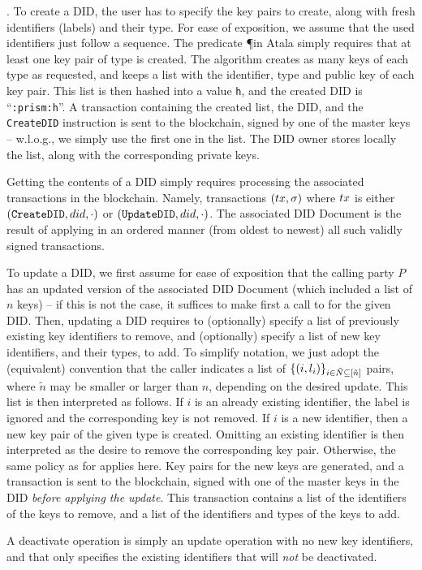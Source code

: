 \begin{description}
\item{.} %
  To create a DID, the user has to specify the key pairs to create, along with
  fresh identifiers (labels) and their type. For ease of exposition, we assume
  that the used identifiers just follow a sequence. The predicate \P in Atala
  simply requires that at least one key pair of \MasterKey type is created. The
   algorithm creates as many keys of each type as requested,
  and keeps a list with the identifier, type and public key of each key pair.
  This list is then hashed into a value \texttt{h}, and the created DID is
  ``\texttt{\did:prism:h}''. A transaction containing the created list, the
  DID, and the \texttt{CreateDID} instruction is sent to the blockchain,
  signed by one of the master keys -- w.l.o.g., we simply use the first one
  in the list. The DID owner stores locally the list, along with the
  corresponding private keys.
\item[\uccmd{Read}.] %
  Getting the contents of a DID simply requires processing the associated
  transactions in the blockchain. Namely, transactions $(tx,\sigma)$ where $tx$
  is either $(\texttt{CreateDID},did,\cdot)$ or $(\texttt{UpdateDID},did,
  \cdot)$. The associated DID Document is the result of applying in an ordered
  manner (from oldest to newest) all such validly signed transactions.
\item[\uccmd{Update}.] %
  To update a DID, we first assume for ease of exposition that the calling party
  $P$ has an updated version of the associated DID Document (which included
  a list of $n$ keys) -- if this is not the case, it suffices to make first a
  call to  for the given DID. 
  Then, updating a DID requires to (optionally) specify a list of previously
  existing key identifiers to remove, and (optionally) specify a list of new key
  identifiers, and their types, to add. To simplify notation, we just adopt the
  (equivalent) convention that the caller indicates a list of $\lbrace (i,
  l_i) \rbrace_{i\in\tilde{N}\subseteq[\tilde{n}]}$ pairs, where $\tilde{n}$
  may be smaller or larger than $n$, depending on the desired update. This
  list is then interpreted as follows. If $i$ is an already existing
  identifier, the label is ignored and the corresponding key is not removed. If
  $i$ is a new identifier, then a new key pair of the given type is created.
  Omitting an existing identifier is then interpreted as the desire to remove
  the corresponding key pair. Otherwise, the same policy as for 
  applies here. Key pairs for the new keys are generated, and a transaction is
  sent to the blockchain, signed with one of the master keys in the DID
  \emph{before applying the update}. This transaction contains a list of the
  identifiers of the keys to remove, and a list of the identifiers and types
  of the keys to add.
\item[\uccmd{Deactivate}.] %
  A deactivate operation is simply an update operation with no new key
  identifiers, and that only specifies the existing identifiers that will
  \emph{not} be deactivated.
\end{description}

